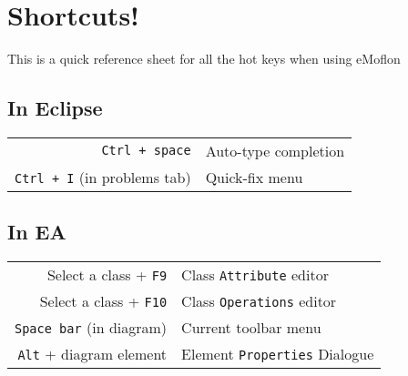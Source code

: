 \newpage
\section{Shortcuts!}
\genHeader

This is a quick reference sheet for all the hot keys when using eMoflon

\subsection{In Eclipse}

\begin{tabular}{r|l}
\texttt{Ctrl + space} & Auto-type completion\\
\texttt{Ctrl + I} (in problems tab) & Quick-fix menu \\
%
\end{tabular}


\subsection{In EA}

\begin{tabular}{r|l}
Select a class + \texttt{F9} & Class \texttt{Attribute} editor \\
Select a class + \texttt{F10} & Class \texttt{Operations} editor \\
\texttt{Space bar} (in diagram) & Current toolbar menu \\
\texttt{Alt} + diagram element & Element \texttt{Properties} Dialogue \\
%
\end{tabular}
